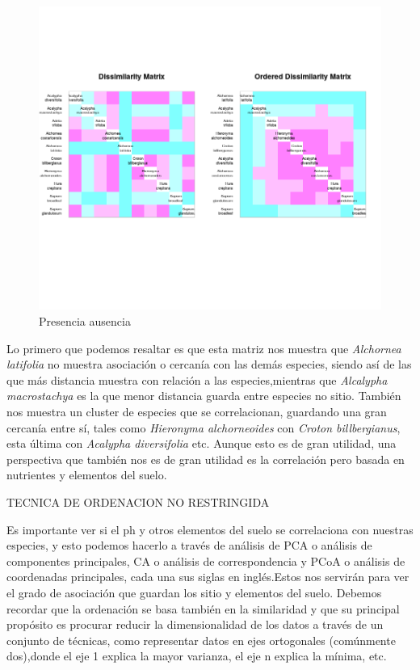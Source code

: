 \documentclass[11pt,]{article}
\begin{document}
\begin{figure}
\centering
\includegraphics{asoc_esp_no_sitio.png}
\caption{\label{fig:asoc_esp_sitio}Presencia ausencia}
\end{figure}

Lo primero que podemos resaltar es que esta matriz nos muestra que
\emph{Alchornea latifolia} no muestra asociación o cercanía con las
demás especies, siendo así de las que más distancia muestra con relación
a las especies,mientras que \emph{Alcalypha macrostachya} es la que
menor distancia guarda entre especies no sitio. También nos muestra un
cluster de especies que se correlacionan, guardando una gran cercanía
entre sí, tales como \emph{Hieronyma alchorneoides} con \emph{Croton
billbergianus}, esta última con \emph{Acalypha diversifolia} etc. Aunque
esto es de gran utilidad, una perspectiva que también nos es de gran
utilidad es la correlación pero basada en nutrientes y elementos del
suelo.

TECNICA DE ORDENACION NO RESTRINGIDA

Es importante ver si el ph y otros elementos del suelo se correlaciona
con nuestras especies, y esto podemos hacerlo a través de análisis de
PCA o análisis de componentes principales, CA o análisis de
correspondencia y PCoA o análisis de coordenadas principales, cada una
sus siglas en inglés.Estos nos servirán para ver el grado de asociación
que guardan los sitio y elementos del suelo. Debemos recordar que la
ordenación se basa también en la similaridad y que su principal
propósito es procurar reducir la dimensionalidad de los datos a través
de un conjunto de técnicas, como representar datos en ejes ortogonales
(comúnmente dos),donde el eje 1 explica la mayor varianza, el eje n
explica la mínima, etc.
\end{document}
